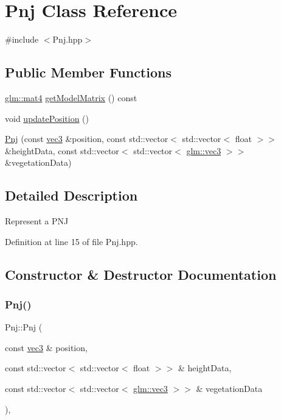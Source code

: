 \hypertarget{class_pnj}{}\section{Pnj Class Reference}
\label{class_pnj}


{\ttfamily \#include $<$Pnj.\+hpp$>$}

\subsection*{Public Member Functions}
\begin{DoxyCompactItemize}
\item 
\hyperlink{group__core__types_ga7dcd2365c2e368e6af5b7adeb6a9c8df}{glm\+::mat4} \hyperlink{class_pnj_a4909dcb594cbf9617d82b5a603739f48}{get\+Model\+Matrix} () const
\item 
void \hyperlink{class_pnj_abcdf1253638bd4719582e9a41929c067}{update\+Position} ()
\item 
\hyperlink{class_pnj_a186b936c5a3359bdb154e529597bacaa}{Pnj} (const \hyperlink{group__core__types_ga1c47e8b3386109bc992b6c48e91b0be7}{vec3} \&position, const std\+::vector$<$ std\+::vector$<$ float $>$$>$ \&height\+Data, const std\+::vector$<$ std\+::vector$<$ \hyperlink{group__core__types_ga1c47e8b3386109bc992b6c48e91b0be7}{glm\+::vec3} $>$$>$ \&vegetation\+Data)
\end{DoxyCompactItemize}


\subsection{Detailed Description}
Represent a P\+NJ 

Definition at line 15 of file Pnj.\+hpp.



\subsection{Constructor \& Destructor Documentation}
\mbox{\label{class_pnj_a186b936c5a3359bdb154e529597bacaa}} 
\subsubsection{\texorpdfstring{Pnj()}{Pnj()}}
{\footnotesize\ttfamily Pnj\+::\+Pnj (\begin{DoxyParamCaption}\item[{const \hyperlink{group__core__types_ga1c47e8b3386109bc992b6c48e91b0be7}{vec3} \&}]{position,  }\item[{const std\+::vector$<$ std\+::vector$<$ float $>$$>$ \&}]{height\+Data,  }\item[{const std\+::vector$<$ std\+::vector$<$ \hyperlink{group__core__types_ga1c47e8b3386109bc992b6c48e91b0be7}{glm\+::vec3} $>$$>$ \&}]{vegetation\+Data }\end{DoxyParamCaption})\hspace{0.3cm}{\ttfamily [inline]}, {\ttfamily [explicit]}}

